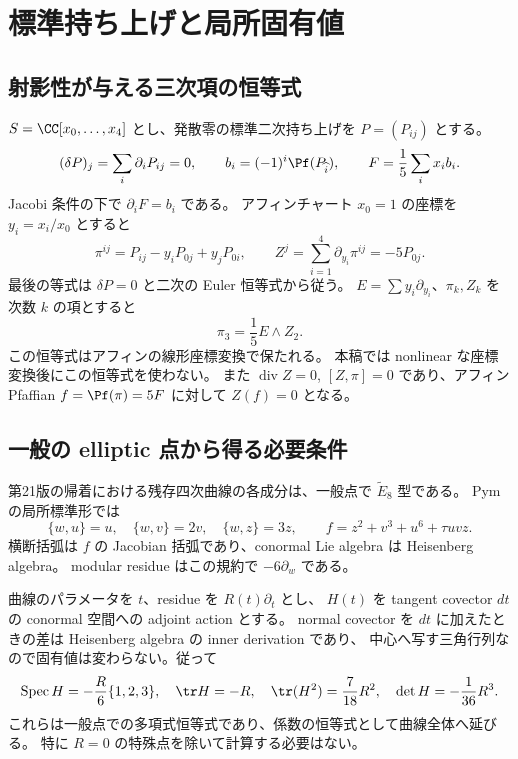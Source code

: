 \section{標準持ち上げと局所固有値}

\subsection{射影性が与える三次項の恒等式}
$S=\CC[x_0,\ldots,x_4]$ とし、発散零の標準二次持ち上げを $P=(P_{ij})$ とする。
\[
 (\delta P)_j=\sum_i\partial_iP_{ij}=0,\qquad
 b_i=(-1)^i\Pf(P_{\widehat i}),\qquad
 F=\frac15\sum_i x_i b_i.
\]
Jacobi 条件の下で $\partial_iF=b_i$ である。
アフィンチャート $x_0=1$ の座標を $y_i=x_i/x_0$ とすると
\[
 \pi^{ij}=P_{ij}-y_iP_{0j}+y_jP_{0i},\qquad
 Z^j=\sum_{i=1}^4\partial_{y_i}\pi^{ij}=-5P_{0j}.
\]
最後の等式は $\delta P=0$ と二次の Euler 恒等式から従う。
$E=\sum y_i\partial_{y_i}$、$\pi_k,Z_k$ を次数 $k$ の項とすると
\begin{equation}\label{eq:radial-cubic}
 \boxed{\pi_3=\frac15E\wedge Z_2.}
\end{equation}
この恒等式はアフィンの線形座標変換で保たれる。
本稿では nonlinear な座標変換後にこの恒等式を使わない。
また $\operatorname{div}Z=0$, $[Z,\pi]=0$ であり、アフィン Pfaffian $f=\Pf(\pi)=5F$
に対して $Z(f)=0$ となる。

\subsection{一般の elliptic 点から得る必要条件}
第21版の帰着における残存四次曲線の各成分は、一般点で $\widetilde E_8$ 型である。
Pym の局所標準形\cite[Theorem 4.5, Table 1]{Pym}では
\[
 \{w,u\}=u,\quad\{w,v\}=2v,\quad\{w,z\}=3z,
 \qquad f=z^2+v^3+u^6+\tau uvz.
\]
横断括弧は $f$ の Jacobian 括弧であり、conormal Lie algebra は Heisenberg algebra。
modular residue はこの規約で $-6\partial_w$ である。

曲線のパラメータを $t$、residue を $R(t)\partial_t$ とし、
$H(t)$ を tangent covector $dt$ の conormal 空間への adjoint action とする。
normal covector を $dt$ に加えたときの差は Heisenberg algebra の inner derivation であり、
中心へ写す三角行列なので固有値は変わらない。従って
\begin{equation}\label{eq:e8-spectrum}
 \operatorname{Spec}H=-\frac R6\{1,2,3\},\quad
 \tr H=-R,\quad \tr(H^2)=\frac7{18}R^2,\quad \det H=-\frac1{36}R^3.
\end{equation}
これらは一般点での多項式恒等式であり、係数の恒等式として曲線全体へ延びる。
特に $R=0$ の特殊点を除いて計算する必要はない。

